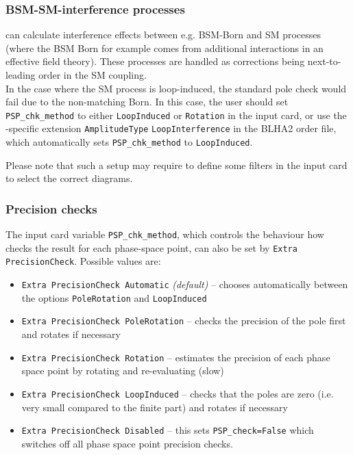 \subsubsection{BSM-SM-interference processes}
\gosam{} can calculate interference effects between e.g. BSM-Born and
SM processes
(where the BSM Born for example comes from additional interactions in an effective field theory).
These processes are handled as corrections being next-to-leading order
in the SM coupling. \\
In the case where the SM process is loop-induced, 
the standard pole check would fail
due to the non-matching Born. In this case, the user should set \texttt{PSP\_chk\_method} to either \texttt{LoopInduced} or \texttt{Rotation} in the \gosam{} input card,
or use the \gosam-specific extension \texttt{AmplitudeType} \texttt{LoopInterference} in the BLHA2 order file,
which automatically sets \texttt{PSP\_chk\_method} to \texttt{LoopInduced}.

Please note that such a setup may require
to define some filters in the input card to select the correct diagrams.

\subsubsection{Precision checks}

The \gosam{} input card variable \texttt{PSP\_chk\_method}, which
controls the behaviour how \gosam{} checks the result for each phase-space point,
can also be set by \texttt{Extra PrecisionCheck}.
Possible values are:

\begin{itemize}
	\item \texttt{Extra PrecisionCheck Automatic} \textit{(default)} -- chooses automatically between the options \texttt{PoleRotation} and \texttt{LoopInduced}
	\item \texttt{Extra PrecisionCheck PoleRotation} -- checks the precision of the pole first and rotates if necessary
	\item \texttt{Extra PrecisionCheck Rotation} -- estimates the precision of each phase space point by rotating and re-evaluating (slow)
	\item \texttt{Extra PrecisionCheck LoopInduced} -- checks that the poles are zero (i.e. very small compared to the finite part) and rotates if necessary
	\item \texttt{Extra PrecisionCheck Disabled}  -- this sets \texttt{PSP\_check=False} which switches off all phase space point precision checks.
\end{itemize}


